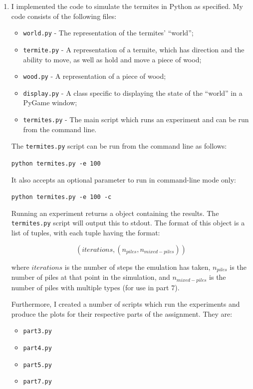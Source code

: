\documentclass{article}
\begin{document}
\begin{enumerate}

\item{} %

I implemented the code to simulate the termites in Python as specified. My code
consists of the following files:
\begin{itemize}
    \item \texttt{world.py} - The representation of the termites' ``world'';
    \item \texttt{termite.py} - A representation of a termite, which has
    direction and the ability to move, as well as hold and move a piece of wood;
    \item \texttt{wood.py} - A representation of a piece of wood;
    \item \texttt{display.py} - A class specific to displaying the state of the
    ``world'' in a PyGame window;
    \item \texttt{termites.py} - The main script which runs an experiment and
    can be run from the command line.
\end{itemize}

The \texttt{termites.py} script can be run from the command line as follows:

\texttt{python termites.py -e 100}

It also accepts an optional parameter to run in command-line mode only:

\texttt{python termites.py -e 100 -c}

Running an experiment returns a object containing the results. The
\texttt{termites.py} script will output this to stdout. The format of this
object is a list of tuples, with each tuple having the format:

$$ (iterations, (n_{piles}, n_{mixed-piles})) $$

where $iterations$ is the number of steps the emulation has taken, $n_{piles}$
is the number of piles at that point in the simulation, and $n_{mixed-piles}$ is
the number of piles with multiple types (for use in part 7).

Furthermore, I created a number of scripts which run the experiments and produce
the plots for their respective parts of the assignment. They are:

\begin{itemize}
    \item \texttt{part3.py}
    \item \texttt{part4.py}
    \item \texttt{part5.py}
    \item \texttt{part7.py}
\end{itemize}


\end{enumerate}
\end{document}
